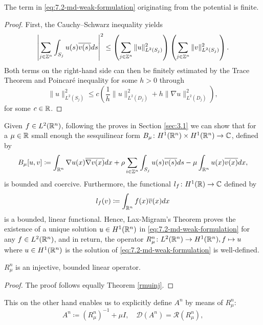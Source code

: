 \begin{remark} 
	The term in \eqref{eq:7.2-md-weak-formulation} originating from the potential is finite.
	
	\begin{proof}
	 First, the Cauchy–Schwarz inequality yields
	\[ \left| \sum_{j \in \mathbb{Z}^{n}} \int_{S_{j}} u(s) \overline{v(s)} ds \right|^{2} \leq \left( \sum_{j \in \mathbb{Z}^{n}} \| u \|_{L^{2}(S_{j})}^{2} \right) \left( \sum_{j \in \mathbb{Z}^{n}} \| v \|_{L^{2}(S_{j})}^{2} \right). \] 
	Both terms on the right-hand side can then be finitely estimated by the Trace Theorem \cite[page 258]{evans1998partial} and Poincaré inequality for some $h > 0$ through
	\[ \| u \|_{L^{2}(S_{j})}^{2} \leq c \left( \frac{1}{h} \|u\|_{L^{2}(D_{j})}^{2} + h \| \nabla u \|_{L^{2}(D_{j})}^{2} \right), \]	
	for some $c \in \mathbb{R}$.
	\end{proof}
\end{remark}

Given $f \in L^{2}(\mathbb{R}^{n})$, following the proves in Section \ref{sec:3.1} we can show that for a $\mu \in \mathbb{R}$ small enough the sesquilinear form $B_{\mu} \colon H^{1}(\mathbb{R}^{n}) \times H^{1}(\mathbb{R}^{n}) \rightarrow \mathbb{C}$, defined by
\[ B_{\mu}[u, v] \coloneqq \int_{\mathbb{R}^{n}} \nabla u(x) \overline{\nabla v(x)} dx + \rho \sum_{i \in \mathbb{Z}^{n}} \int_{S_{j}} u(s) \overline{v(s)} ds - \mu \int_{\mathbb{R}^{n}} u(x) \overline{v(x)} dx, \]
 is  bounded and coercive. Furthermore, the functional $l_{f} \colon H^{1}(\mathbb{R}) \rightarrow \mathbb{C}$ defined by
	\[ l_{f}(v) \coloneqq \int_{\mathbb{R}^{n}} f(x) \overline{v}(x) dx \]
is a bounded, linear functional. Hence, Lax-Migram's Theorem proves the existence of a unique solution $u \in H^{1}(\mathbb{R}^{n})$ in \eqref{eq:7.2-md-weak-formulation} for any $f \in L^{2}(\mathbb{R}^{n})$, and in return, the operator $R_{\mu}^{n} \colon L^{2}(\mathbb{R}^{n}) \rightarrow H^{1}(\mathbb{R}^{n}), f \mapsto u$ where $u \in H^{1}(\mathbb{R}^{n})$ is the solution of \eqref{eq:7.2-md-weak-formulation} is well-defined. 

\begin{theorem} 
	$R_{\mu}^{n}$ is an injective, bounded linear operator. 
	
	\begin{proof}
		The proof follows equally Theorem \ref{rmuinj}.
	\end{proof}
\end{theorem}

This on the other hand enables us to explicitly define $A^{n}$ by means of $R_{\mu}^{n}$:
\[ A^{n} \coloneqq \left(R_{\mu}^{n}\right)^{-1} + \mu I, \quad \mathcal{D}(A^{n}) = \mathcal{R}(R_{\mu}^{n}), \]

